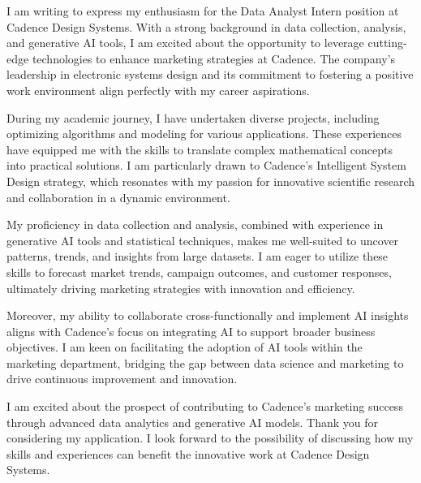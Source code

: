 \documentclass[]{cover}
\begin{document}

\hfill

\begin{minipage}[t]{0.5\textwidth}
\end{minipage}

\begin{minipage}[t]{0.49\textwidth}
\currentdate{\today}
\end{minipage}


I am writing to express my enthusiasm for the Data Analyst Intern position at Cadence Design Systems. With a strong background in data collection, analysis, and generative AI tools, I am excited about the opportunity to leverage cutting-edge technologies to enhance marketing strategies at Cadence. The company's leadership in electronic systems design and its commitment to fostering a positive work environment align perfectly with my career aspirations.

During my academic journey, I have undertaken diverse projects, including optimizing algorithms and modeling for various applications. These experiences have equipped me with the skills to translate complex mathematical concepts into practical solutions. I am particularly drawn to Cadence's Intelligent System Design strategy, which resonates with my passion for innovative scientific research and collaboration in a dynamic environment.

My proficiency in data collection and analysis, combined with experience in generative AI tools and statistical techniques, makes me well-suited to uncover patterns, trends, and insights from large datasets. I am eager to utilize these skills to forecast market trends, campaign outcomes, and customer responses, ultimately driving marketing strategies with innovation and efficiency.

Moreover, my ability to collaborate cross-functionally and implement AI insights aligns with Cadence's focus on integrating AI to support broader business objectives. I am keen on facilitating the adoption of AI tools within the marketing department, bridging the gap between data science and marketing to drive continuous improvement and innovation.

I am excited about the prospect of contributing to Cadence's marketing success through advanced data analytics and generative AI models. Thank you for considering my application. I look forward to the possibility of discussing how my skills and experiences can benefit the innovative work at Cadence Design Systems.


\signature{Adem Mcharek}
\end{document}
